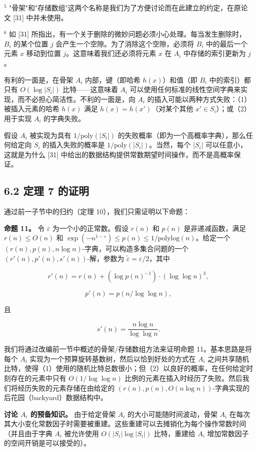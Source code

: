 \documentclass[12pt,a4paper]{ctexart}
\theoremstyle{remark}
\begin{document}
$^5$ "骨架"和"存储数组"这两个名称是我们为了方便讨论而在此建立的约定，在原论文 [31] 中并未使用。

$^6$ 如 [31] 所指出，有一个关于删除的微妙问题必须小心处理。每当发生删除时，$B_i$ 的某个位置 $j$ 会产生一个空隙。为了消除这个空隙，必须将 $B_i$ 中的最后一个元素 $x$ 移动到位置 $j$。这意味着我们还必须将元素 $x$ 在 $A_i$ 中存储的索引更新为 $j$。

有利的一面是，在骨架 $A_i$ 内部，键（即哈希 $h(x)$）和值（即 $B_i$ 中的索引）都只有 $O(\log|S_i|)$ 比特——这意味着 $A_i$ 可以使用任何标准的线性空间字典来实现，而不必担心简洁性。不利的一面是，向 $A_i$ 的插入可能以两种方式失败：（1）被插入元素的哈希 $h(x)$ 满足 $h(x)=h(x')$（对某个其他 $x'\in S_i$）；或（2）用于实现 $A_i$ 的字典失败。

假设 $A_i$ 被实现为具有 $1/\text{poly}(|S_i|)$ 的失败概率（即为一个高概率字典），那么任何给定向 $S_i$ 的插入失败的概率是 $1/\text{poly}(|S_i|)$。当然，每个 $|S_i|$ 可以任意小，这就是为什么 [31] 中给出的数据结构提供常数期望时间操作，而不是高概率保证。

\subsection{6.2 定理 7 的证明}
通过前一子节中的归约（定理 10），我们只需证明以下命题：

\textbf{命题 11。} 令 $\varepsilon$ 为一个小的正常数。假设 $r(n)$ 和 $p(n)$ 是非递减函数，满足 $r(n)\leq O(n)$ 和 $\exp(-n^{1-\varepsilon})\leq p(n)\leq 1/\text{polylog}(n)$。给定一个 $(r(n),p(n),n\log n)$-字典，可以构造多集合问题的一个 $(r'(n),p'(n),s'(n))$-解，参数为 $\tilde{\varepsilon}=\varepsilon/2$，其中

$$r'(n)=r(n)+(\log p(n)^{-1})\cdot(\log\log n)^3,$$

$$p'(n)=p(n/\log\log n),$$

且

$$s'(n)=\frac{n\log n}{\log\log n}.$$

我们将通过改编前一节中概述的骨架/存储数组方法来证明命题 11。基本思路是将每个 $A_i$ 实现为一个预算旋转基数树，然后以恰到好处的方式在 $A_i$ 之间共享随机比特，使得（1）使用的随机比特总数很小；但（2）以良好的概率，在任何给定时刻存在的元素中只有 $O(1/\log\log n)$ 比例的元素在插入时经历了失败。然后我们将经历失败的元素存储在由给定的 $(r(n),p(n),O(n\log n))$-字典实现的后花园（backyard）数据结构中。

\textbf{讨论 $A_i$ 的预备知识。} 由于给定骨架 $A_i$ 的大小可能随时间波动，骨架 $A_i$ 在每次其大小变化常数因子时需要被重建。这些重建可以去摊销化为每个操作常数时间（并且由于字典 $A_i$ 被允许使用 $O(|S_i|\log|S_i|)$ 比特，重建给 $A_i$ 增加常数因子的空间开销是可以接受的）。
\end{document}

